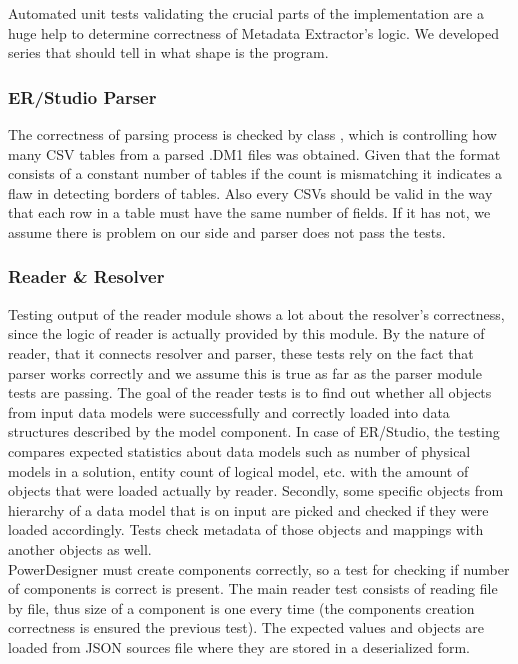 Automated unit tests validating the crucial parts of the implementation are a huge help to determine correctness of Metadata Extractor's logic. 
We developed series that should tell in what shape is the program.

\subsubsection{ER/Studio Parser}

The correctness of parsing process is checked by class , which is controlling how many CSV tables from a parsed .DM1 files was obtained. Given that the format consists of a constant number of tables if the count is mismatching it indicates a flaw in detecting borders of tables.
Also every CSVs should be valid in the way that each row in a table must have the same number of fields. If it has not, we assume there is problem on our side and parser does not pass the tests.

\subsubsection{Reader \& Resolver}

Testing output of the reader module shows a lot about the resolver's correctness, since the logic of reader is actually provided by this module. 
By the nature of reader, that it connects resolver and parser, these tests rely on the fact that parser works correctly and we assume this is true as far as the parser module tests are passing.
The goal of the reader tests is to find out whether all objects from input data models were successfully and correctly loaded into data structures described by the model component.
In case of ER/Studio, the testing compares expected statistics about data models such as number of physical models in a solution, entity count of logical model, etc. with the amount of objects that were loaded actually by reader.
Secondly, some specific objects from hierarchy of a data model that is on input are picked and checked if they were loaded accordingly. Tests check metadata of those objects and mappings with another objects as well. \\ 

PowerDesigner must create components correctly, so a test for checking if number of components is correct is present.
The main reader test consists of reading file by file, thus size of a component is one every time (the components creation correctness is ensured the previous test).
The expected values and objects are loaded from JSON sources file where they are stored in a deserialized form.

